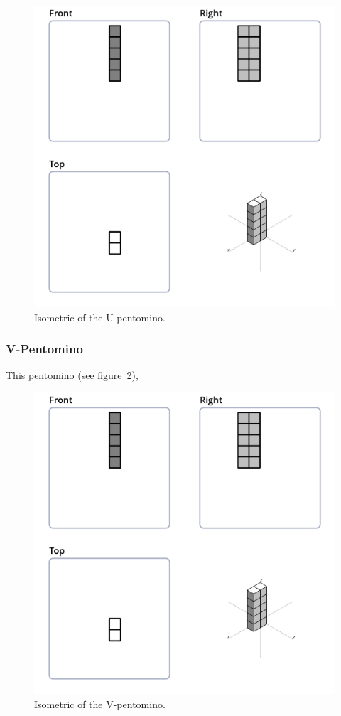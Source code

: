 \begin{figure}
	\centering
	\includegraphics[scale=0.3]{iso_diagrams/o.png}
	\caption{Isometric of the U-pentomino.}
  \label{fig:iso-pent-u}
\end{figure}
\subsubsection{V-Pentomino}
This pentomino (see figure~\ref{fig:iso-pent-v}),


\begin{figure}
	\centering
	\includegraphics[scale=0.3]{iso_diagrams/o.png}
	\caption{Isometric of the V-pentomino.}
  \label{fig:iso-pent-v}
\end{figure}

